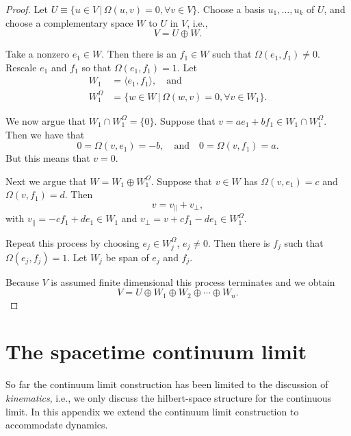 \documentclass[prl,twocolumn,lengthcheck,superscriptaddress]{revtex4-1}
\theoremstyle{definition}
\theoremstyle{remark}
\begin{document}
\begin{proof}
	Let $U \equiv \{u\in V\,|\, \Omega(u,v) = 0, \forall v\in V\}$. Choose a basis $u_1, \ldots, u_k$ of $U$, and choose a complementary space $W$ to $U$ in $V$, i.e., 
	\begin{equation}
		V = U\oplus W.
	\end{equation}
		
	Take a nonzero $e_1\in W$. Then there is an $f_1\in W$ such that $\Omega(e_1, f_1) \not= 0$. Rescale $e_1$ and $f_1$ so that $\Omega(e_1,f_1) = 1$. Let 
	\begin{equation}
		\begin{split}
			W_1 &= \langle e_1, f_1 \rangle, \quad \text{and} \\
			W_1^{\Omega} &= \{w\in W\,|\, \Omega(w, v) = 0, \forall v\in W_1\}.
		\end{split}
	\end{equation}

We now argue that $W_1\cap W_1^{\Omega}= \{0\}$. Suppose that $v = ae_1 + bf_1 \in W_1\cap W_1^{\Omega}$. Then we have that
\begin{equation}
	0 = \Omega(v,e_1) = -b, \quad \text{and} \quad 0 = \Omega(v, f_1) = a.
\end{equation}
But this means that $v=0$.

Next we argue that $W = W_1\oplus W_1^{\Omega}$. Suppose that $v\in W$ has $\Omega(v, e_1) = c$ and $\Omega(v, f_1)= d$. Then
\begin{equation}
	v = v_{\|} + v_{\perp},
\end{equation}
with $v_{\|} = -cf_1 + d e_1 \in W_1$ and $v_{\perp} = v+cf_1-de_1 \in W_1^\Omega$.

Repeat this process by choosing $e_j\in W_j^\Omega$, $e_j\not=0$. Then there is $f_j$ such that $\Omega(e_j,f_j) = 1$. Let $W_j$ be span of $e_j$ and $f_j$.

Because $V$ is assumed finite dimensional this process terminates and we obtain
\begin{equation}
	V = U\oplus W_1\oplus W_2 \oplus \cdots \oplus W_n.
\end{equation}
\end{proof}

\section{The spacetime continuum limit}
So far the continuum limit construction has been limited to the discussion of \emph{kinematics}, i.e., we only discuss the hilbert-space structure for the continuous limit. In this appendix we extend the continuum limit construction to accommodate dynamics. 
\end{document}
